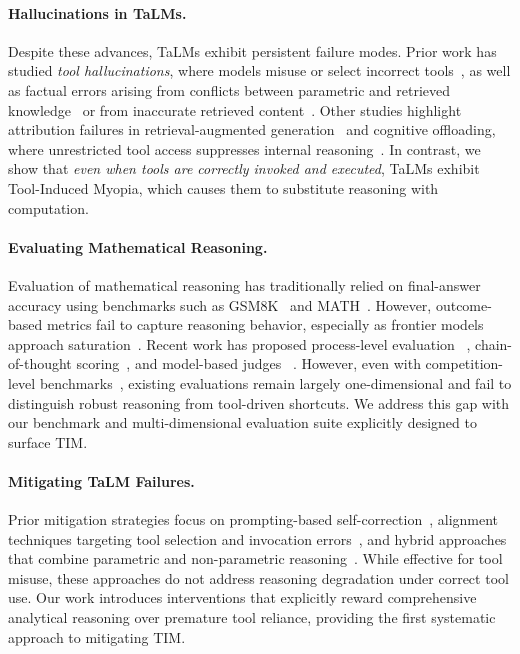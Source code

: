 \documentclass[11pt]{article}
\def \task{\textsc{TIM}\xspace}
\begin{document}
\paragraph{Hallucinations in TaLMs.}
Despite these advances, TaLMs exhibit persistent failure modes. Prior work has studied \textit{tool hallucinations}, where models misuse or select incorrect tools~\citep{xu2025reducingtoolhallucinationreliability}, as well as factual errors arising from conflicts between parametric and retrieved knowledge~\citep{sun2025redeepdetectinghallucinationretrievalaugmented} or from inaccurate retrieved content~\citep{magesh2024hallucinationfreeassessingreliabilityleading}. Other studies highlight attribution failures in retrieval-augmented generation~\citep{gao-etal-2023-enabling, liu-etal-2023-evaluating} and cognitive offloading, where unrestricted tool access suppresses internal reasoning~\citep{qian-etal-2025-smart, wang2025actingreasoningmoreteaching}.  
In contrast, we show that \emph{even when tools are correctly invoked and executed}, TaLMs exhibit Tool-Induced Myopia, which causes them to substitute reasoning with computation.

\paragraph{Evaluating Mathematical Reasoning.}
Evaluation of mathematical reasoning has traditionally relied on final-answer accuracy using benchmarks such as GSM8K~\citep{cobbe2021gsm8k} and MATH~\citep{hendrycks2021math}. However, outcome-based metrics fail to capture reasoning behavior, especially as frontier models approach saturation~\citep{mondorf2024accuracyevaluatingreasoningbehavior}. Recent work has proposed process-level evaluation ~\citep{lightman2023letsverifystepstep, zheng-etal-2025-processbench}, chain-of-thought scoring~\citep{xiareasoneval, li-etal-2025-fg}, and model-based judges ~\citep{mathcheck, xu2025reducingtoolhallucinationreliability}. However, even with competition-level benchmarks~\citep{AIME20242025, he-etal-2024-olympiadbench, gao2024omnimathuniversalolympiadlevel}, existing evaluations remain largely one-dimensional and fail to distinguish robust reasoning from tool-driven shortcuts. 
We address this gap with our benchmark and multi-dimensional evaluation suite explicitly designed to surface \task{}.

\paragraph{Mitigating TaLM Failures.}
Prior mitigation strategies focus on prompting-based self-correction~\citep{shinn2023reflexion}, alignment techniques targeting tool selection and invocation errors~\citep{qintoollearning, patilGorilla, ross-etal-2025-when2call, xu2025reducingtoolhallucinationreliability}, and hybrid approaches that combine parametric and non-parametric reasoning~\citep{asai2024selfrag}. While effective for tool misuse, these approaches do not address reasoning degradation under correct tool use. Our work introduces interventions that explicitly reward comprehensive analytical reasoning over premature tool reliance, providing the first systematic approach to mitigating \task.
\end{document}
